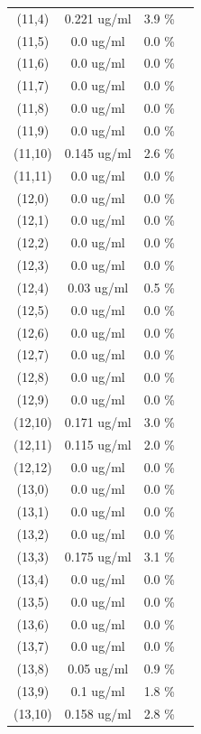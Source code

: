 \documentclass{article}
\begin{document}
\begin{tabular}{c c c c}
(11,4)&        0.221 ug/ml        &3.9 \%\\
(11,5)&        0.0 ug/ml        &0.0 \%\\
(11,6)&        0.0 ug/ml        &0.0 \%\\
(11,7)&        0.0 ug/ml        &0.0 \%\\
(11,8)&        0.0 ug/ml        &0.0 \%\\
(11,9)&        0.0 ug/ml        &0.0 \%\\
(11,10)&        0.145 ug/ml        &2.6 \%\\
(11,11)&        0.0 ug/ml        &0.0 \%\\
(12,0)&        0.0 ug/ml        &0.0 \%\\
(12,1)&        0.0 ug/ml        &0.0 \%\\
(12,2)&        0.0 ug/ml        &0.0 \%\\
(12,3)&        0.0 ug/ml        &0.0 \%\\
(12,4)&        0.03 ug/ml        &0.5 \%\\
(12,5)&        0.0 ug/ml        &0.0 \%\\
(12,6)&        0.0 ug/ml        &0.0 \%\\
(12,7)&        0.0 ug/ml        &0.0 \%\\
(12,8)&        0.0 ug/ml        &0.0 \%\\
(12,9)&        0.0 ug/ml        &0.0 \%\\
(12,10)&        0.171 ug/ml        &3.0 \%\\
(12,11)&        0.115 ug/ml        &2.0 \%\\
(12,12)&        0.0 ug/ml        &0.0 \%\\
(13,0)&        0.0 ug/ml        &0.0 \%\\
(13,1)&        0.0 ug/ml        &0.0 \%\\
(13,2)&        0.0 ug/ml        &0.0 \%\\
(13,3)&        0.175 ug/ml        &3.1 \%\\
(13,4)&        0.0 ug/ml        &0.0 \%\\
(13,5)&        0.0 ug/ml        &0.0 \%\\
(13,6)&        0.0 ug/ml        &0.0 \%\\
(13,7)&        0.0 ug/ml        &0.0 \%\\
(13,8)&        0.05 ug/ml        &0.9 \%\\
(13,9)&        0.1 ug/ml        &1.8 \%\\
(13,10)&        0.158 ug/ml        &2.8 \%\\

\end{tabular}
\end{document}
